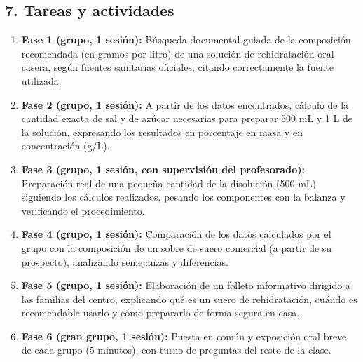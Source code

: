 \documentclass[11pt,a4paper]{article}
\begin{document}
\subsection*{7. Tareas y actividades}
\begin{enumerate}
    \item \textbf{Fase 1 (grupo, 1 sesión):} Búsqueda documental guiada de la composición recomendada (en gramos por litro) de una solución de rehidratación oral casera, según fuentes sanitarias oficiales, citando correctamente la fuente utilizada.
    \item \textbf{Fase 2 (grupo, 1 sesión):} A partir de los datos encontrados, cálculo de la cantidad exacta de sal y de azúcar necesarias para preparar 500 mL y 1 L de la solución, expresando los resultados en porcentaje en masa y en concentración (g/L).
    \item \textbf{Fase 3 (grupo, 1 sesión, con supervisión del profesorado):} Preparación real de una pequeña cantidad de la disolución (500 mL) siguiendo los cálculos realizados, pesando los componentes con la balanza y verificando el procedimiento.
    \item \textbf{Fase 4 (grupo, 1 sesión):} Comparación de los datos calculados por el grupo con la composición de un sobre de suero comercial (a partir de su prospecto), analizando semejanzas y diferencias.
    \item \textbf{Fase 5 (grupo, 1 sesión):} Elaboración de un folleto informativo dirigido a las familias del centro, explicando qué es un suero de rehidratación, cuándo es recomendable usarlo y cómo prepararlo de forma segura en casa.
    \item \textbf{Fase 6 (gran grupo, 1 sesión):} Puesta en común y exposición oral breve de cada grupo (5 minutos), con turno de preguntas del resto de la clase.
\end{enumerate}
\end{document}
